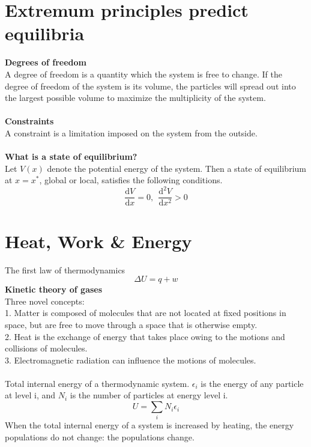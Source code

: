 \documentclass[8pt]{article}
\numberwithin{equation}{section}
\begin{document}
\begin{multicols}{2}
\section{Extremum principles predict equilibria}
\textbf{Degrees of freedom}\\
A degree of freedom is a quantity which the system is free to change. If the degree of freedom of the system is its volume, the particles will spread out into the largest possible volume to maximize the multiplicity of the system.  \\\\
\textbf{Constraints} \\
A constraint is a limitation imposed on the system from the outside. \\\\
\textbf{What is a state of equilibrium?} \\
Let $V(x)$ denote the potential energy of the system. Then a state of equilibrium at $x=x^{*}$, global or local, satisfies the following conditions. 
\begin{equation}
\frac{\mathrm{d}V}{\mathrm{d}x}=0, \ \ \frac{\mathrm{d}^{2}V}{\mathrm{d}x^{2}}>0 \tag{2.2}
\end{equation}
\section{Heat, Work \& Energy}
The first law of thermodynamics  
\begin{equation}
\Delta U=q+w  \tag{-} 
\end{equation}
\textbf{Kinetic theory of gases}\\
Three novel concepts: \\
1. Matter is composed of molecules that are not located at fixed positions in space, but are free to move through a space that is otherwise empty. \\
2. Heat is the exchange of energy that takes place owing to the motions and collisions of molecules. \\ 3. Electromagnetic radiation can influence the motions of molecules. \\\\
Total internal energy of a thermodynamic system. $\epsilon_{i}$ is the energy of any particle at level i, and $N_{i}$ is the number of particles at energy level i. 
\begin{equation}
U=\sum_{i} N_{i} \epsilon_{i}
\end{equation}
When the total internal energy of a system is increased by heating, the energy populations do not change: the populations change. 


\end{multicols}
\end{document}
